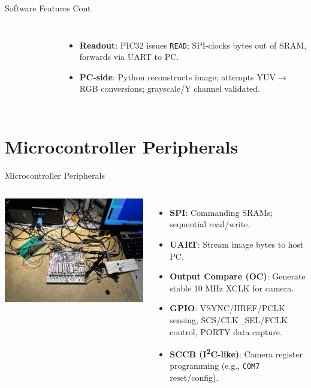 \documentclass{beamer}
\begin{document}
\begin{frame}{Software Features Cont.}
\begin{columns}
\begin{figure}[H]
    \end{figure}
      \begin{itemize}
      \item \textbf{Readout}: PIC32 issues \texttt{READ}; SPI-clocks bytes out of SRAM, forwards via UART to PC.
      \item \textbf{PC-side}: Python reconstructs image; attempts YUV$\rightarrow$RGB conversions; grayscale/Y channel validated.
      \end{itemize}
  \end{columns}
\end{frame}

\section{Microcontroller Peripherals}
\begin{frame}{Microcontroller Peripherals}
  \begin{columns}
    \includegraphics[width=\textwidth]{whole_project.jpg}

    \begin{itemize}
  \item \textbf{SPI}: Commanding SRAMs; sequential read/write.
  \item \textbf{UART}: Stream image bytes to host PC.
  \item \textbf{Output Compare (OC)}: Generate stable 10 MHz XCLK for camera.
  \item \textbf{GPIO}: VSYNC/HREF/PCLK sensing, SCS/CLK\_SEL/FCLK control, PORTY data capture.
  \item \textbf{SCCB (I\textsuperscript{2}C-like)}: Camera register programming (e.g., \texttt{COM7} reset/config).
    \end{itemize}
  \end{columns}
\end{frame}
\end{document}

